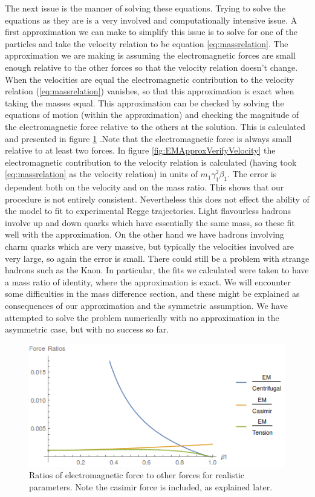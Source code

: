 \documentclass[11pt,a4paper]{article}
\begin{document}
The next issue is the manner of solving these equations. Trying to solve the equations as they are is a very involved and computationally intensive issue. A first approximation we can make to simplify this issue is to solve for one of the particles and take the velocity relation to be equation \ref{eq:massrelation}. The approximation we are making is assuming the electromagnetic forces are small enough relative to the other forces so that the velocity relation doesn't change. When the velocities are equal the electromagnetic contribution to the velocity relation (\ref{eq:massrelation}) vanishes, so that this approximation is exact when taking the masses equal. This approximation can be checked by solving the equations of motion (within the approximation) and checking the magnitude of the electromagnetic force relative to the others at the solution. This is calculated and presented in figure \ref{fig:EMApproxVerify} .Note that the electromagnetic force is always small relative to at least two forces. In figure \ref{fig:EMApproxVerifyVelocity} the electromagnetic contribution to the velocity relation is calculated (having took \ref{eq:massrelation} as the velocity relation) in units of $m_1\gamma_1^2\beta_1$. The error is dependent both on the velocity and on the mass ratio. This shows that our procedure is not entirely consistent. Nevertheless this does not effect the ability of the model to fit to experimental Regge trajectories. Light flavourless hadrons involve up and down quarks which have essentially the same mass, so these fit well with the approximation. On the other hand we have hadrons involving charm quarks which are very massive, but typically the velocities involved are very large, so again the error is small. There could still be a problem with strange hadrons such as the Kaon. In particular, the fits we calculated were taken to have a mass ratio of identity, where the approximation is exact. We will encounter some difficulties in the mass difference section, and these might be explained as consequences of our approximation and the symmetric assumption. We have attempted to solve the problem numerically with no approximation in the asymmetric case, but with no success so far.

\begin{figure}[h]
\centering
\includegraphics[scale=0.7]{figures/VerifyEMApprox.png}
\caption{Ratios of electromagnetic force to other forces for realistic parameters. Note the casimir force is included, as explained later.}
\label{fig:EMApproxVerify}
\end{figure}
\end{document}

